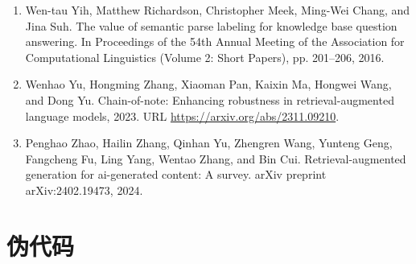 \documentclass[11pt,UTF8,fontset=fandol]{ctexart}
\begin{document}
\begin{enumerate}[leftmargin=2em]
\item Wen-tau Yih, Matthew Richardson, Christopher Meek, Ming-Wei Chang, and Jina Suh. The value of semantic parse labeling for knowledge base question answering. In Proceedings of the 54th Annual Meeting of the Association for Computational Linguistics (Volume 2: Short Papers), pp. 201--206, 2016.
\item Wenhao Yu, Hongming Zhang, Xiaoman Pan, Kaixin Ma, Hongwei Wang, and Dong Yu. Chain-of-note: Enhancing robustness in retrieval-augmented language models, 2023. URL \url{https://arxiv.org/abs/2311.09210}.
\item Penghao Zhao, Hailin Zhang, Qinhan Yu, Zhengren Wang, Yunteng Geng, Fangcheng Fu, Ling Yang, Wentao Zhang, and Bin Cui. Retrieval-augmented generation for ai-generated content: A survey. arXiv preprint arXiv:2402.19473, 2024.
\end{enumerate}

\appendix
\section{伪代码}
\end{document}
